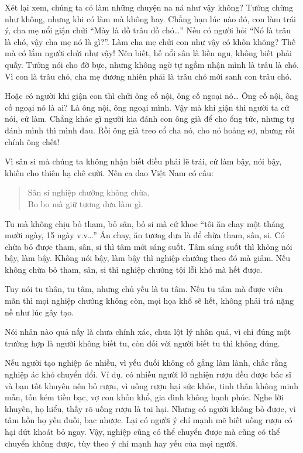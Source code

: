 \documentclass[
  12pt,
  oneside]{book}
\begin{document}
Xét lại xem, chúng ta có làm những chuyện na ná như vậy không? Tưởng chừng như không, nhưng khi có làm mà không hay. Chẳng hạn lúc nào đó, con làm trái ý, cha mẹ nổi giận chửi ``Mày là đồ trâu đồ chó\ldots{}'' Nếu có người hỏi ``Nó là trâu là chó, vậy cha mẹ nó là gì?''. Làm cha mẹ chửi con như vậy có khôn không? Thế mà có lắm người chửi như vậy! Nên biết, hễ nổi sân là liền ngu, không biết phải quấy. Tưởng nói cho đỡ bực, nhưng không ngờ tự ngầm nhận mình là trâu là chó. Vì con là trâu chó, cha mẹ đương nhiên phải là trâu chó mới sanh con trâu chó.

Hoặc có người khi giận con thì chửi ông cố nội, ông cố ngoại nó\ldots{} Ông cố nội, ông cố ngoại nó là ai? Là ông nội, ông ngoại mình. Vậy mà khi giận thì người ta cứ nói, cứ làm. Chẳng khác gì người kia đánh con ông già để cho ổng tức, nhưng tự đánh mình thì mình đau. Rồi ông già treo cổ cha nó, cho nó hoảng sợ, nhưng rồi chính ông chết!

Vì sân si mà chúng ta không nhận biết điều phải lẽ trái, cứ làm bậy, nói bậy, khiến cho thiên hạ chê cười. Nên ca dao Việt Nam có câu:

\begin{quote}
Sân si nghiệp chướng không chừa,\\
Bo bo mà giữ tương dưa làm gì.
\end{quote}

Tu mà không chịu bỏ tham, bỏ sân, bỏ si mà cứ khoe ``tôi ăn chay một tháng mười ngày, 15 ngày v.v\ldots{}'' Ăn chay, ăn tương dưa là để chừa tham, sân, si. Có chừa bỏ được tham, sân, si thì tâm mới sáng suốt. Tâm sáng suốt thì không nói bậy, làm bậy. Không nói bậy, làm bậy thì nghiệp chướng theo đó mà giảm. Nếu không chừa bỏ tham, sân, si thì nghiệp chướng tội lỗi khó mà hết được.

Tuy nói tu thân, tu tâm, nhưng chủ yếu là tu tâm. Nếu tu tâm mà được viên mãn thì mọi nghiệp chướng không còn, mọi họa khổ sẽ hết, không phải trả nặng nề như lúc gây tạo.

Nói nhân nào quả nấy là chưa chính xác, chưa lột lý nhân quả, vì chỉ đúng một trường hợp là người không biết tu, còn đối với người biết tu thì không đúng.

Nếu người tạo nghiệp ác nhiều, vì yếu đuối không cố gắng làm lành, chắc rằng nghiệp ác khó chuyển đổi. Ví dụ, có nhiều người lỡ nghiện rượu đều được bác sĩ và bạn tốt khuyên nên bỏ rượu, vì uống rượu hại sức khỏe, tinh thần không minh mẫn, tốn kém tiền bạc, vợ con khốn khổ, gia đình không hạnh phúc. Nghe lời khuyên, họ hiểu, thấy rõ uống rượu là tai hại. Nhưng có người không bỏ được, vì tâm hồn họ yếu đuối, bạc nhược. Lại có người ý chí mạnh mẽ biết uống rượu có hại dứt khoát bỏ ngay. Vậy, nghiệp cũng có thể chuyển được mà cũng có thể chuyển không được, tùy theo ý chí mạnh hay yếu của mọi người.
\end{document}

